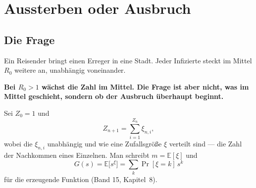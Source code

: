 \chapter{Aussterben oder Ausbruch}

\section{Die Frage}

\begin{merksatz}
Ein Reisender bringt einen Erreger in eine Stadt. Jeder Infizierte steckt im Mittel $R_0$ weitere an, unabhängig voneinander.

\begin{center}
\begin{minipage}{0.9\textwidth}
\textbf{Bei $R_0 > 1$ wächst die Zahl im Mittel. Die Frage ist aber nicht, was im Mittel geschieht, sondern ob der Ausbruch überhaupt beginnt.}
\end{minipage}
\end{center}

\begin{center}
\begin{minipage}{0.88\textwidth}
\end{minipage}
\end{center}
\end{merksatz}

\begin{definition}
Sei $Z_0 = 1$ und
\[ Z_{n+1} = \sum_{i=1}^{Z_n} \xi_{n,i} , \]
wobei die $\xi_{n,i}$ unabhängig und wie eine Zufallsgröße $\xi$ verteilt sind --- die Zahl der Nachkommen eines Einzelnen. Man schreibt $m = \mathbb{E}[\xi]$ und
\[ G(s) = \mathbb{E}\bigl[s^{\xi}\bigr] = \sum_k \Pr[\xi = k]\,s^{k} \]
für die erzeugende Funktion (Band 15, Kapitel~8).
\end{definition}

